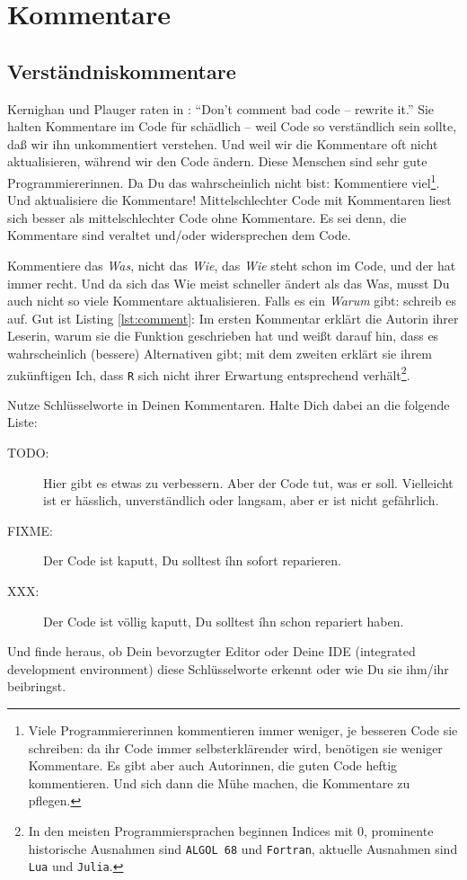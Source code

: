 \documentclass[twoside]{scrreprt}
\providecommand{\R}{\texttt{R}}
\begin{document}
\section{Kommentare}
\subsection{Verst\"a{}ndniskommentare\label{sec:compcom}}
Kernighan und Plauger raten in \cite{KP}:
"`Don't comment bad code -- rewrite it."'
Sie halten Kommentare im Code f\"u{}r sch\"a{}dlich  --
weil Code so verst\"a{}ndlich sein sollte, da\ss{} wir ihn unkommentiert
verstehen.
Und weil wir die Kommentare oft nicht aktualisieren, w\"a{}hrend wir den Code
\"a{}ndern.
Diese Menschen sind sehr gute Programmiererinnen.
Da Du das wahrscheinlich nicht bist:
Kommentiere viel\footnote{Viele Programmiererinnen kommentieren immer weniger,
    je besseren Code sie schreiben: da ihr Code immer selbsterkl\"a{}render
    wird, ben\"o{}tigen sie weniger Kommentare. Es gibt aber auch Autorinnen,
    die guten Code heftig kommentieren. Und sich dann die M\"u{}he machen, die
    Kommentare zu pflegen.
}.
Und aktualisiere die Kommentare!
Mittelschlechter Code mit Kommentaren liest sich besser als mittelschlechter 
Code ohne Kommentare. Es sei denn, die Kommentare sind veraltet und/oder
widersprechen dem Code.

Kommentiere das \emph{Was}, nicht das \emph{Wie}, das \emph{Wie} steht schon im
Code, und der hat immer recht.
Und da sich das Wie meist schneller \"a{}ndert als das Was, musst Du auch
nicht so viele Kommentare aktualisieren.
Falls es ein \emph{Warum} gibt: schreib es auf.
Gut ist  Listing \ref{lst:comment}: Im ersten Kommentar erkl\"a{}rt die Autorin
ihrer Leserin, warum sie die Funktion geschrieben hat und wei\ss{}t darauf hin,
dass es wahrscheinlich (bessere) Alternativen gibt; mit dem zweiten
erkl\"a{}rt sie ihrem zuk\"u{}nftigen Ich, dass \R{} sich nicht ihrer Erwartung
entsprechend verh\"a{}lt\footnote{In den meisten Programmiersprachen beginnen
    Indices mit 0, prominente historische Ausnahmen sind \texttt{ALGOL 68} und
    \texttt{Fortran}, aktuelle Ausnahmen sind \texttt{Lua} und \texttt{Julia}.}.


Nutze Schl\"u{}sselworte in Deinen Kommentaren. Halte Dich dabei an die folgende
Liste:
\begin{description}
\item[TODO:] Hier gibt es etwas zu verbessern. Aber der Code tut, was er soll.
  Vielleicht ist er h\"a{}sslich, 
  unverst\"a{}ndlich oder langsam,
  aber er ist nicht gef\"a{}hrlich.
\item[FIXME:] Der Code ist kaputt, Du solltest íhn sofort reparieren.
\item[XXX:] Der Code ist v\"o{}llig kaputt, Du solltest íhn schon repariert
    haben.
\end{description}
Und finde heraus, ob Dein bevorzugter Editor oder Deine IDE (integrated
development environment) diese Schl\"u{}sselworte erkennt oder wie Du sie
ihm/ihr beibringst.
\end{document}
